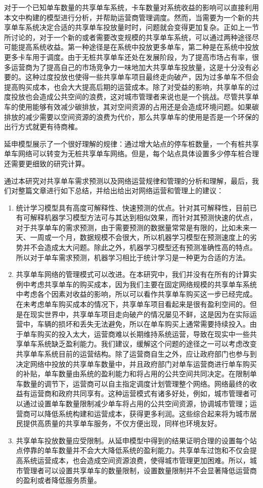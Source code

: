 \documentclass[]{tongjithesis}
\numberwithin{equation}{chapter}
\begin{document}
对于一个已知单车数量的共享单车系统，卡车数量对系统收益的影响可以直接利用本文中构建的模型进行分析，并帮助运营商管理调度。然而，当需要为一个新的共享单车系统决定合适的共享单车投放量时时，问题就会变得更加复杂。正如上一节所讨论的，对于一个新的或者需要改变规模的共享单车系统，可以通过两种途径尽可能提高系统收益。第一种途径是在系统中投放更多单车，第二种是在系统中投放更多卡车用于调度。由于无桩共享单车还处在发展阶段，为了提高市场占有率，很多运营商为了提高自己的市场竞争力一味地加大共享单车投放量，这是十分没有必要的。这种过度投放也使得一些共享单车项目最终走向破产，因为过多单车不但会提高购买成本，也会大大提高后期的运营成本。除了对受益的影响，共享单车的过度投放也会造成公共空间的浪费，这对城市管理者来说也是一个挑战。尽管共享单车的使用能够有效减少碳排放，其对空间资源的占用还是会造成环境问题。如果碳排放的减少需要以空间资源的浪费为代价，那么共享单车的使用是否是一个环保的出行方式就更有待商榷。

延申模型展示了一个很好理解的规律：通过增大站点的停车桩数量，一个有桩共享单车网络可以转变为无桩共享单车网络。但是，每个站点具体设置多少停车桩合理还需要更细致的研究计算。

通过本研究对共享单车需求预测以及网络运营规律和管理的分析和理解，最后，我们对整篇文章进行如下总结，并给出给出对网络运营和管理上的建议：
\begin{enumerate}
	\item 统计学习模型具有高度可解释性、快速预测的优点。针对其可解释性，目前已有可解释机器学习模型方法可与其达到相似效果，而针对其预测快速的优点，对于共享单车的需求预测，由于需要预测的数据量常常是有限的，比如未来一天、一周或一个月，数据规模不会很大，所以机器学习模型在预测速度上的劣势并不会造成太大问题。除此之外，机器学习模型还有预测准确性高的特点。所以对于单车需求预测，机器学习相比于统计学习是一种更为合适的方法。
	\item  共享单车网络的管理模式可以改进。在本研究中，我们并没有在所有的计算实例中考虑共享单车的购买成本，因为我们主要在固定网络规模的共享单车系统中考虑各个因素对收益的影响，所以可以看作共享单车购买这一步已经完成。在未考虑单车购买成本的情况下，共享单车项目看起来是很有盈利空间的。但是在现实世界中，共享单车项目走向破产的情况屡见不鲜，这是因为在实际运营中，车辆的损坏和丢失无法避免，所以在单车购买上通常需要持续投入。由于单车购买的投入太大，运营商难以长期维持系统运营，导致在现实中一些共享单车系统缺乏盈利能力。我们建议，缓解这个问题的途径之一可以考虑改变共享单车系统目前的运营结构。除了运营商自生之外，应让政府部门也参与到决定网络中投放的共享单车数量中，并且政府部门对单车运营商进行单车购买的补贴，单车数量由系统的盈利能力和将占用的公共空间共同决定。在限制单车数量的调节下，运营商可以自主指定调度计划管理整个网络。网络最终的收益有运营商和政府共同享有。这种运营模式有诸多好处，例如，城市管理者可以通过设置单车数量限制减少单车将占用的公共空间资源，协调城市管理；运营商可以降低系统构建和运营成本，获得更多利润。这些综合起来将为城市居民提供高质量的共享单车服务，不仅方便出现，同样也环境友好。
	\item  共享单车投放数量应受限制。从延申模型中得到的结果证明合理的设置每个站点停靠的单车数量并不会大大降低系统的盈利能力。共享单车过饱和不仅会提高系统运营成本，也会造成空间资源浪费，使得城市管理更加困难。所以，城市管理者可以设置共享单车的数量限制，设置数量限制并不会显著降低运营商的盈利或者降低服务质量。
\end{enumerate}
\end{document}
